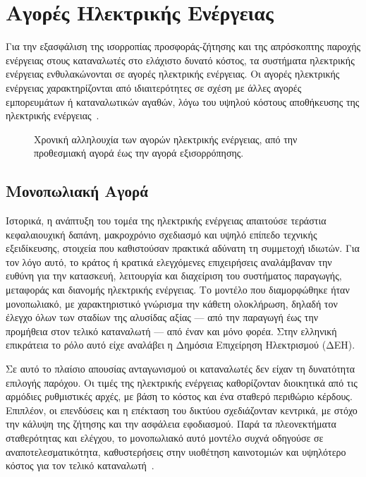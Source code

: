 \section{Αγορές Ηλεκτρικής Ενέργειας}
\label{sec:energy-markets}

Για την εξασφάλιση της ισορροπίας προσφοράς-ζήτησης και της απρόσκοπτης παροχής ενέργειας στους καταναλωτές στο ελάχιστο δυνατό κόστος, τα συστήματα ηλεκτρικής ενέργειας ενθυλακώνονται σε αγορές ηλεκτρικής ενέργειας. Οι αγορές ηλεκτρικής ενέργειας χαρακτηρίζονται από ιδιαιτερότητες σε σχέση με άλλες αγορές εμπορευμάτων ή καταναλωτικών αγαθών, λόγω του υψηλού κόστους αποθήκευσης της ηλεκτρικής ενέργειας~\cite{mo2025}.

\begin{figure}[htbp]
\centering
\caption{Χρονική αλληλουχία των αγορών ηλεκτρικής ενέργειας, από την προθεσμιακή αγορά έως την αγορά εξισορρόπησης.}
\label{fig:market-structure}
\end{figure}

\subsection{Μονοπωλιακή Αγορά}
\label{subsec:monopoly-market}

Ιστορικά, η ανάπτυξη του τομέα της ηλεκτρικής ενέργειας απαιτούσε τεράστια κεφαλαιουχική δαπάνη, μακροχρόνιο σχεδιασμό και υψηλό επίπεδο τεχνικής εξειδίκευσης, στοιχεία που καθιστούσαν πρακτικά αδύνατη τη συμμετοχή ιδιωτών. Για τον λόγο αυτό, το κράτος ή κρατικά ελεγχόμενες επιχειρήσεις αναλάμβαναν την ευθύνη για την κατασκευή, λειτουργία και διαχείριση του συστήματος παραγωγής, μεταφοράς και διανομής ηλεκτρικής ενέργειας. Το μοντέλο που διαμορφώθηκε ήταν μονοπωλιακό, με χαρακτηριστικό γνώρισμα την κάθετη ολοκλήρωση, δηλαδή τον έλεγχο όλων των σταδίων της αλυσίδας αξίας --- από την παραγωγή έως την προμήθεια στον τελικό καταναλωτή --- από έναν και μόνο φορέα. Στην ελληνική επικράτεια το ρόλο αυτό είχε αναλάβει η Δημόσια Επιχείρηση Ηλεκτρισμού (ΔΕΗ).

Σε αυτό το πλαίσιο απουσίας ανταγωνισμού οι καταναλωτές δεν είχαν τη δυνατότητα επιλογής παρόχου. Οι τιμές της ηλεκτρικής ενέργειας καθορίζονταν διοικητικά από τις αρμόδιες ρυθμιστικές αρχές, με βάση το κόστος και ένα σταθερό περιθώριο κέρδους. Επιπλέον, οι επενδύσεις και η επέκταση του δικτύου σχεδιάζονταν κεντρικά, με στόχο την κάλυψη της ζήτησης και την ασφάλεια εφοδιασμού. Παρά τα πλεονεκτήματα σταθερότητας και ελέγχου, το μονοπωλιακό αυτό μοντέλο συχνά οδηγούσε σε αναποτελεσματικότητα, καθυστερήσεις στην υιοθέτηση καινοτομιών και υψηλότερο κόστος για τον τελικό καταναλωτή~\cite{vlados2021}.

